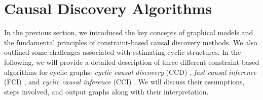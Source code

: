 \documentclass[twoside, 11pt]{article}
\newcommand*{\figref}[2][]{%
  \hyperref[{fig:#2}]{%
    Figure~\ref*{fig:#2}%
    \ifx\\#1\\%
    \else
      #1%
    \fi
  }%
}
\begin{document}







\section{Causal Discovery Algorithms} \label{cdalgo}

In the previous section, we introduced the key concepts of graphical models and the fundamental principles of constraint-based causal discovery methods. We also outlined some challenges associated with estimating cyclic structures. In the following, we will provide a detailed description of three different constraint-based algorithms for cyclic graphs: \textit{cyclic causal discovery} (CCD) \citep{Richardson1996a}, \textit{fast causal inference} (FCI) \citep{mooij_classen2020}, and \textit{cyclic causal inference} (CCI) \citep{strobl2019}. We will discuss their assumptions, steps involved, and output graphs along with their interpretation.

\end{document}
